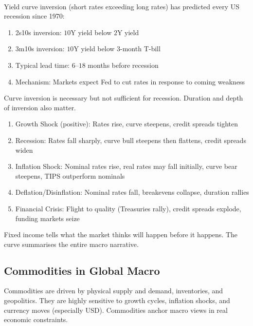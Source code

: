 \documentclass[a4paper,oneside,openany]{book}
\begin{document}
\begin{remark} \\
Yield curve inversion (short rates exceeding long rates) has predicted every US recession since 1970:
\begin{enumerate}[label=\roman*.]
\setlength{\itemsep}{0pt}
\item 2s10s inversion: $10$Y yield below $2$Y yield
\item 3m10s inversion: $10$Y yield below $3$-month T-bill
\item Typical lead time: $6$--$18$ months before recession
\item Mechanism: Markets expect Fed to cut rates in response to coming weakness
\end{enumerate}
Curve inversion is necessary but not sufficient for recession. Duration and depth of inversion also matter.
\end{remark}

\begin{remark} 
\begin{enumerate}[label=\roman*.]
\setlength{\itemsep}{0pt}
\item Growth Shock (positive): Rates rise, curve steepens, credit spreads tighten
\item Recession: Rates fall sharply, curve bull steepens then flattens, credit spreads widen
\item Inflation Shock: Nominal rates rise, real rates may fall initially, curve bear steepens, TIPS outperform nominals
\item Deflation/Disinflation: Nominal rates fall, breakevens collapse, duration rallies
\item Financial Crisis: Flight to quality (Treasuries rally), credit spreads explode, funding markets seize
\end{enumerate}
Fixed income tells what the market thinks will happen before it happens. The curve summarises the entire macro narrative.
\end{remark}

\subsection*{Commodities in Global Macro}

Commodities are driven by physical supply and demand, inventories, and geopolitics. They are highly sensitive to growth cycles, inflation shocks, and currency moves (especially USD). Commodities anchor macro views in real economic constraints.
\end{document}
